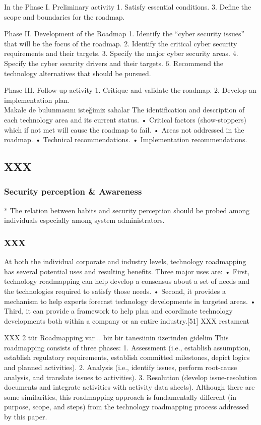 \documentclass[journal]{IEEEtran}
\begin{document}
In the Phase I. Preliminary activity
1. Satisfy essential conditions.
3. Define the scope and boundaries for the roadmap.

Phase II. Development of the Roadmap
1. Identify the “cyber security issues” that will be the focus of the roadmap.
2. Identify the critical cyber security requirements and their targets.
3. Specify the major cyber security areas.
4. Specify the cyber security drivers and their targets.
6. Recommend the technology alternatives that should be pursued.

Phase III. Follow-up activity
1. Critique and validate the roadmap.
2. Develop an implementation plan.
\\

	
	Makale de bulunmasını isteğimiz sahalar
	The identification and description of each technology area and its current status.
	• Critical factors (show-stoppers) which if not met will cause the roadmap to fail.
	• Areas not addressed in the roadmap.
	• Technical recommendations.
	• Implementation recommendations.

\subsection{XXX}

\subsubsection{Security perception \& Awareness}
* The relation between habits and security perception should be probed among individuals especially among system administrators.
\subsubsection{XXX}
At both the individual corporate and industry levels, technology roadmapping has
several potential uses and resulting benefits. Three major uses are:
• First, technology roadmapping can help develop a consensus about a set of needs and
the technologies required to satisfy those needs.
• Second, it provides a mechanism to help experts forecast technology developments in
targeted areas.
• Third, it can provide a framework to help plan and coordinate technology
developments both within a company or an entire industry.[51] XXX  restament

XXX 2 tür Roadmapping var .. biz bir  tanesiinin  üzerinden gidelim
This roadmapping consists of three phases:
1. Assessment (i.e., establish assumption, establish regulatory requirements, establish
committed milestones, depict logics and planned activities).
2. Analysis (i.e., identify issues, perform root-cause analysis, and translate issues to
activities).
3. Resolution (develop issue-resolution documents and integrate activities with activity
data sheets).
Although there are some similarities, this roadmapping approach is fundamentally
different (in purpose, scope, and steps) from the technology roadmapping process
addressed by this paper.\cite{garcia1997fundamentals}
\\
\end{document}
